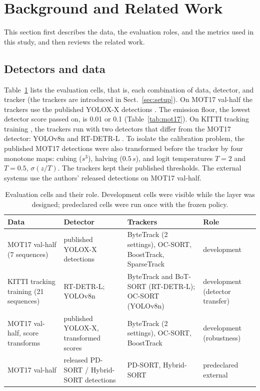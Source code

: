 \documentclass[pdflatex,sn-mathphys-num,iicol]{sn-jnl}
\begin{document}
\section{Background and Related Work}\label{sec:related}

This section first describes the data, the evaluation roles, and the metrics
used in this study, and then reviews the related work.

\subsection{Detectors and data}\label{sec:data}
Table~\ref{tab:data} lists the evaluation cells, that is, each combination of
data, detector, and tracker (the trackers are introduced in Sect.~\ref{sec:setup}). On MOT17 val-half
\cite{milan2016mot16} the trackers use the published YOLOX-X detections
\cite{ge2021yolox}. The emission floor, the lowest detector score passed on,
is 0.01 or 0.1 (Table~\ref{tab:mot17}). On KITTI tracking training \cite{geiger2012kitti}, the trackers run
with two detectors that differ from the MOT17 detector: YOLOv8n
\cite{jocher2023yolov8} and RT-DETR-L \cite{zhao2024rtdetr}. To isolate the
calibration problem, the published MOT17 detections were also transformed
before the tracker by four monotone maps: cubing ($s^3$), halving ($0.5\,s$),
and logit temperatures $T=2$ and $T=0.5$, $\sigma(z/T)$. The trackers kept
their published thresholds. The external systems use the authors' released
detections on MOT17 val-half.

\begin{table}[t]
\caption{Evaluation cells and their role. Development cells were visible while
the layer was designed; predeclared cells were run once with the frozen
policy.}
\label{tab:data}
\centering\footnotesize
\setlength{\tabcolsep}{4pt}
\begin{tabular}{@{}>{\raggedright\arraybackslash}p{36mm}>{\raggedright\arraybackslash}p{32mm}>{\raggedright\arraybackslash}p{50mm}>{\raggedright\arraybackslash}p{30mm}@{}}
\toprule
Data & Detector & Trackers & Role\\
\midrule
MOT17 val-half (7 sequences) & published YOLOX-X detections & ByteTrack (2 settings), OC-SORT, BoostTrack, SparseTrack & development\\
KITTI tracking training (21 sequences) & RT-DETR-L; YOLOv8n & ByteTrack and BoT-SORT (RT-DETR-L); OC-SORT (YOLOv8n) & development (detector transfer)\\
MOT17 val-half, score transforms & published YOLOX-X, transformed scores & ByteTrack (2 settings), OC-SORT, BoostTrack & development (robustness)\\
MOT17 val-half & released PD-SORT / Hybrid-SORT detections & PD-SORT, Hybrid-SORT & predeclared external\\
\bottomrule
\end{tabular}
\end{table}
\end{document}

